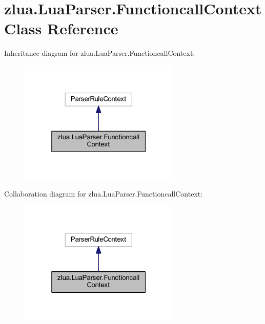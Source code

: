 \hypertarget{classzlua_1_1_lua_parser_1_1_functioncall_context}{}\section{zlua.\+Lua\+Parser.\+Functioncall\+Context Class Reference}
\label{classzlua_1_1_lua_parser_1_1_functioncall_context}


Inheritance diagram for zlua.\+Lua\+Parser.\+Functioncall\+Context\+:
\nopagebreak
\begin{figure}[H]
\begin{center}
\leavevmode
\includegraphics[width=217pt]{classzlua_1_1_lua_parser_1_1_functioncall_context__inherit__graph}
\end{center}
\end{figure}


Collaboration diagram for zlua.\+Lua\+Parser.\+Functioncall\+Context\+:
\nopagebreak
\begin{figure}[H]
\begin{center}
\leavevmode
\includegraphics[width=217pt]{classzlua_1_1_lua_parser_1_1_functioncall_context__coll__graph}
\end{center}
\end{figure}
